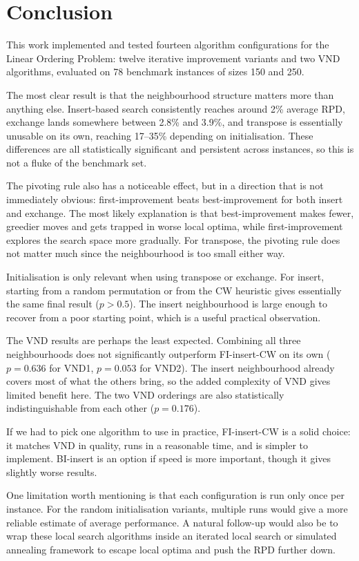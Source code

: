 \chapter{Conclusion}

This work implemented and tested fourteen algorithm configurations for the
Linear Ordering Problem: twelve iterative improvement variants and two VND
algorithms, evaluated on 78 benchmark instances of sizes 150 and 250.

The most clear result is that the neighbourhood structure matters more than
anything else. Insert-based search consistently reaches around 2\% average
RPD, exchange lands somewhere between 2.8\% and 3.9\%, and transpose is
essentially unusable on its own, reaching 17--35\% depending on
initialisation. These differences are all statistically significant and
persistent across instances, so this is not a fluke of the benchmark set.

The pivoting rule also has a noticeable effect, but in a direction that is not
immediately obvious: first-improvement beats best-improvement for both insert
and exchange. The most likely explanation is that best-improvement makes
fewer, greedier moves and gets trapped in worse local optima, while
first-improvement explores the search space more gradually. For transpose, the
pivoting rule does not matter much since the neighbourhood is too small either
way.

Initialisation is only relevant when using transpose or exchange. For insert,
starting from a random permutation or from the CW heuristic gives essentially
the same final result ($p > 0.5$). The insert neighbourhood is large enough to
recover from a poor starting point, which is a useful practical observation.

The VND results are perhaps the least expected. Combining all three
neighbourhoods does not significantly outperform FI-insert-CW on its own
($p = 0.636$ for VND1, $p = 0.053$ for VND2). The insert neighbourhood
already covers most of what the others bring, so the added complexity of VND
gives limited benefit here. The two VND orderings are also statistically
indistinguishable from each other ($p = 0.176$).

If we had to pick one algorithm to use in practice, FI-insert-CW is a solid
choice: it matches VND in quality, runs in a reasonable time, and is simpler
to implement. BI-insert is an option if speed is more important, though it
gives slightly worse results.

One limitation worth mentioning is that each configuration is run only once
per instance. For the random initialisation variants, multiple runs would give
a more reliable estimate of average performance. A natural follow-up would
also be to wrap these local search algorithms inside an iterated local search
or simulated annealing framework to escape local optima and push the RPD
further down.

